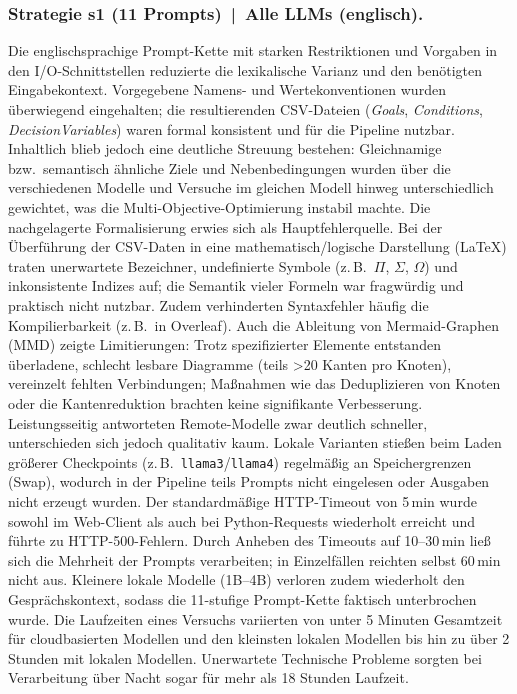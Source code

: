 \documentclass[runningheads]{llncs}
\begin{document}
\subsubsection{Strategie s1 (11 Prompts) \,|\, Alle LLMs (englisch).}
Die englischsprachige Prompt-Kette mit starken Restriktionen und Vorgaben in den I/O-Schnittstellen reduzierte die lexikalische Varianz und den benötigten Eingabekontext. Vorgegebene Namens- und Wertekonventionen wurden überwiegend eingehalten; die resultierenden CSV-Dateien (\emph{Goals}, \emph{Conditions}, \emph{DecisionVariables}) waren formal konsistent und für die Pipeline nutzbar. Inhaltlich blieb jedoch eine deutliche Streuung bestehen: Gleichnamige bzw.\ semantisch ähnliche Ziele und Nebenbedingungen wurden über die verschiedenen Modelle und Versuche im gleichen Modell hinweg unterschiedlich gewichtet, was die Multi-Objective-Optimierung instabil machte. Die nachgelagerte Formalisierung erwies sich als Hauptfehlerquelle. Bei der Überführung der CSV-Daten in eine mathematisch/logische Darstellung (LaTeX) traten unerwartete Bezeichner, undefinierte Symbole (z.\,B.\ \(\Pi\), \(\Sigma\), \(\Omega\)) und inkonsistente Indizes auf; die Semantik vieler Formeln war fragwürdig und praktisch nicht nutzbar. Zudem verhinderten Syntaxfehler häufig die Kompilierbarkeit (z.\,B.\ in Overleaf). Auch die Ableitung von Mermaid-Graphen (MMD) zeigte Limitierungen: Trotz spezifizierter Elemente entstanden überladene, schlecht lesbare Diagramme (teils >20 Kanten pro Knoten), vereinzelt fehlten Verbindungen; Maßnahmen wie das Deduplizieren von Knoten oder die Kantenreduktion brachten keine signifikante Verbesserung. Leistungsseitig antworteten Remote-Modelle zwar deutlich schneller, unterschieden sich jedoch qualitativ kaum. Lokale Varianten stießen beim Laden größerer Checkpoints (z.\,B.\ \texttt{llama3}/\texttt{llama4}) regelmäßig an Speichergrenzen (Swap), wodurch in der Pipeline teils Prompts nicht eingelesen oder Ausgaben nicht erzeugt wurden. Der standardmäßige HTTP-Timeout von 5\,min wurde sowohl im Web-Client als auch bei Python-Requests wiederholt erreicht und führte zu HTTP-500-Fehlern. Durch Anheben des Timeouts auf 10--30\,min ließ sich die Mehrheit der Prompts verarbeiten; in Einzelfällen reichten selbst 60\,min nicht aus. Kleinere lokale Modelle (1B--4B) verloren zudem wiederholt den Gesprächskontext, sodass die 11-stufige Prompt-Kette faktisch unterbrochen wurde. Die Laufzeiten eines Versuchs variierten von unter 5 Minuten Gesamtzeit für cloudbasierten Modellen und den kleinsten lokalen Modellen bis hin zu über 2 Stunden mit lokalen Modellen. Unerwartete Technische Probleme sorgten bei Verarbeitung über Nacht sogar für mehr als 18 Stunden Laufzeit.
\end{document}
